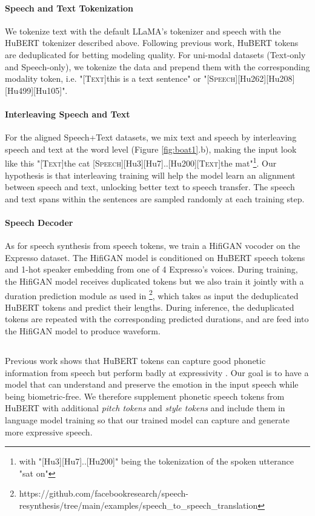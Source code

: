 \paragraph{Speech and Text Tokenization} We tokenize text with the default LLaMA's tokenizer and speech with the HuBERT tokenizer described above. %
Following previous work, HuBERT tokens are deduplicated for betting modeling quality. For uni-modal datasets (Text-only and Speech-only), we tokenize the data and prepend them with the corresponding modality token, i.e. "\textsc{[Text]}this is a text sentence" or "\textsc{[Speech]}[Hu262][Hu208][Hu499][Hu105]".

\paragraph{Interleaving Speech and Text} For the aligned Speech+Text datasets, we mix text and speech by interleaving speech and text at the word level (Figure \ref{fig:boat1}.b), making the input look like this "\textsc{[Text]}the cat \textsc{[Speech]}[Hu3][Hu7]..[Hu200]\textsc{[Text]}the mat"\footnote{with "[Hu3][Hu7]..[Hu200]" being the tokenization of the spoken utterance "sat on"}. Our hypothesis is that interleaving training will help the model learn an alignment between speech and text, unlocking better text to speech transfer. The speech and text spans within the sentences are sampled randomly at each training step.

\paragraph{Speech Decoder} As for speech synthesis from speech tokens, we train a HifiGAN \citep{kong2020hifigan, polyak2021speechresynthesis} vocoder on the Expresso dataset. The HifiGAN model is conditioned on HuBERT speech tokens and 1-hot speaker embedding from one of 4 Expresso's voices. 
During training, the HifiGAN model receives duplicated tokens but we also train it jointly with a duration prediction module as used in \citealp{lee-etal-2022-direct, lee-etal-2022-textless}\footnote{https://github.com/facebookresearch/speech-resynthesis/tree/main/examples/speech\_to\_speech\_translation}, which takes as input the deduplicated HuBERT tokens and predict their lengths. During inference, the deduplicated tokens are repeated with the corresponding predicted durations, and are feed into the HifiGAN model to produce waveform.

\subsection{\spotexpressive}\label{sec:spotexpressive}
Previous work shows that HuBERT tokens can capture good phonetic information from speech but perform badly at expressivity \citep{nguyen2023expresso}.
Our goal is to have a model that can understand and preserve the emotion in the input speech while being biometric-free.
We therefore supplement phonetic speech tokens from HuBERT with additional \textit{pitch tokens} and \textit{style tokens} and include them in language model training so that our trained \spotexpressive model can capture and generate more expressive speech. 

